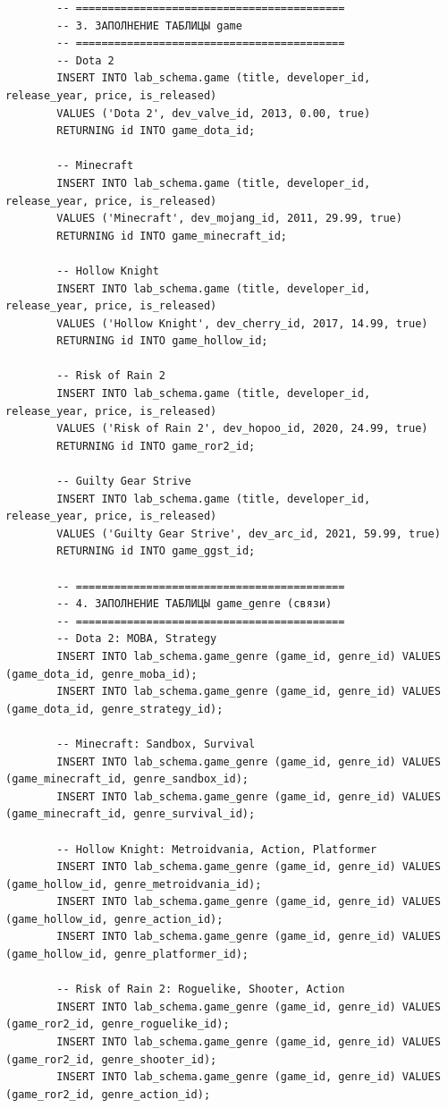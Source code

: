 \documentclass[oneside,a4paper,14pt]{extarticle}
\begin{document}
\begin{lstlisting}
		-- ==========================================
		-- 3. ЗАПОЛНЕНИЕ ТАБЛИЦЫ game
		-- ==========================================
		-- Dota 2
		INSERT INTO lab_schema.game (title, developer_id, release_year, price, is_released)
		VALUES ('Dota 2', dev_valve_id, 2013, 0.00, true)
		RETURNING id INTO game_dota_id;
		
		-- Minecraft
		INSERT INTO lab_schema.game (title, developer_id, release_year, price, is_released)
		VALUES ('Minecraft', dev_mojang_id, 2011, 29.99, true)
		RETURNING id INTO game_minecraft_id;
		
		-- Hollow Knight
		INSERT INTO lab_schema.game (title, developer_id, release_year, price, is_released)
		VALUES ('Hollow Knight', dev_cherry_id, 2017, 14.99, true)
		RETURNING id INTO game_hollow_id;
		
		-- Risk of Rain 2
		INSERT INTO lab_schema.game (title, developer_id, release_year, price, is_released)
		VALUES ('Risk of Rain 2', dev_hopoo_id, 2020, 24.99, true)
		RETURNING id INTO game_ror2_id;
		
		-- Guilty Gear Strive
		INSERT INTO lab_schema.game (title, developer_id, release_year, price, is_released)
		VALUES ('Guilty Gear Strive', dev_arc_id, 2021, 59.99, true)
		RETURNING id INTO game_ggst_id;
		
		-- ==========================================
		-- 4. ЗАПОЛНЕНИЕ ТАБЛИЦЫ game_genre (связи)
		-- ==========================================
		-- Dota 2: MOBA, Strategy
		INSERT INTO lab_schema.game_genre (game_id, genre_id) VALUES (game_dota_id, genre_moba_id);
		INSERT INTO lab_schema.game_genre (game_id, genre_id) VALUES (game_dota_id, genre_strategy_id);
		
		-- Minecraft: Sandbox, Survival
		INSERT INTO lab_schema.game_genre (game_id, genre_id) VALUES (game_minecraft_id, genre_sandbox_id);
		INSERT INTO lab_schema.game_genre (game_id, genre_id) VALUES (game_minecraft_id, genre_survival_id);
		
		-- Hollow Knight: Metroidvania, Action, Platformer
		INSERT INTO lab_schema.game_genre (game_id, genre_id) VALUES (game_hollow_id, genre_metroidvania_id);
		INSERT INTO lab_schema.game_genre (game_id, genre_id) VALUES (game_hollow_id, genre_action_id);
		INSERT INTO lab_schema.game_genre (game_id, genre_id) VALUES (game_hollow_id, genre_platformer_id);
		
		-- Risk of Rain 2: Roguelike, Shooter, Action
		INSERT INTO lab_schema.game_genre (game_id, genre_id) VALUES (game_ror2_id, genre_roguelike_id);
		INSERT INTO lab_schema.game_genre (game_id, genre_id) VALUES (game_ror2_id, genre_shooter_id);
		INSERT INTO lab_schema.game_genre (game_id, genre_id) VALUES (game_ror2_id, genre_action_id);
		

\end{lstlisting}
\end{document}

